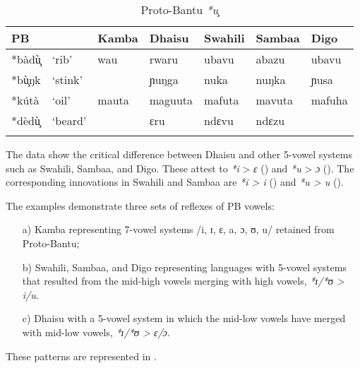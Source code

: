 \documentclass[output=paper,colorlinks,citecolor=brown]{langscibook}
\begin{document}
\begin{table}
    \caption{Proto-Bantu \textit{*u}̧}
    \label{tab:ngonyani:12}
    \begin{tabular}{l@{ }l *5{l}}
    \lsptoprule
        PB & & Kamba & Dhaisu & Swahili & Sambaa & Digo \\
        \midrule
        *bàdù̧  & `rib' & wau & rwaru  & ubavu & abazu & ubavu \\
        *bù̧ŋk & `stink' &  & ɲuŋga & nuka & nuŋka & ɲusa\\
        *kútà & `oil' & mauta & maguuta & mafuta & mavuta & mafuha\\
        *dèdù̧ & `beard' &  & ɛru & ndɛvu & ndɛzu & \\
    \lspbottomrule
    \end{tabular}
\end{table}

The data show the critical difference between Dhaisu and other 5-vowel systems such as Swahili, Sambaa, and Digo. These attest to \textit{*i} > \textit{ɛ} () and  \textit{*u} >  \textit{ɔ} (). The corresponding innovations in Swahili and Sambaa are \textit{*i > i} () and \textit{*u > u} ().

The examples demonstrate three sets of reflexes of PB vowels:

\begin{enumerate}
    \item[a)] Kamba representing 7-vowel systems /i, ɪ, ɛ, a, ɔ, ʊ, u/ retained from Proto-Bantu; 
    \item[b)] Swahili, Sambaa, and Digo representing languages with 5-vowel systems that resulted from the mid-high vowels merging with high vowels,  \textit{ *ɪ/*ʊ >  i/u}.
    \item[c)] Dhaisu with a 5-vowel system in which the mid-low vowels have merged with mid-low vowels, \textit{*ɪ/*ʊ > ɛ/ɔ}.
\end{enumerate}

\noindent These patterns are represented in .
\end{document}
